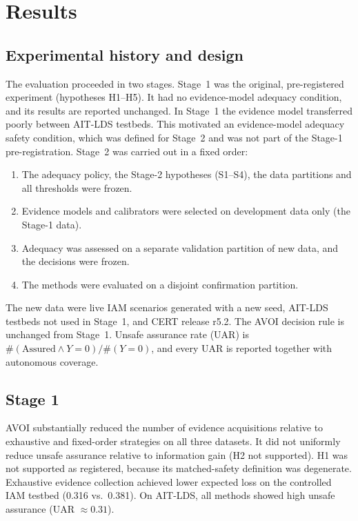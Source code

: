 \section{Results}

\subsection{Experimental history and design}
The evaluation proceeded in two stages. Stage~1 was the original, pre-registered experiment (hypotheses H1--H5). It had
no evidence-model adequacy condition, and its results are reported unchanged. In Stage~1 the evidence model transferred
poorly between AIT-LDS testbeds. This motivated an evidence-model adequacy safety condition, which was defined for
Stage~2 and was not part of the Stage-1 pre-registration. Stage~2 was carried out in a fixed order:
\begin{enumerate}
  \item The adequacy policy, the Stage-2 hypotheses (S1--S4), the data partitions and all thresholds were frozen.
  \item Evidence models and calibrators were selected on development data only (the Stage-1 data).
  \item Adequacy was assessed on a separate validation partition of new data, and the decisions were frozen.
  \item The methods were evaluated on a disjoint confirmation partition.
\end{enumerate}
The new data were live IAM scenarios generated with a new seed, AIT-LDS testbeds not used in Stage~1, and CERT release
r5.2. The AVOI decision rule is unchanged from Stage~1. Unsafe assurance rate (UAR) is
$\#(\text{Assured}\wedge Y{=}0)/\#(Y{=}0)$, and every UAR is reported together with autonomous coverage.

\subsection{Stage 1}
AVOI substantially reduced the number of evidence acquisitions relative to exhaustive and fixed-order strategies on all
three datasets. It did not uniformly reduce unsafe assurance relative to information gain (H2 not supported). H1 was not
supported as registered, because its matched-safety definition was degenerate. Exhaustive evidence collection achieved
lower expected loss on the controlled IAM testbed (0.316 vs.\ 0.381). On AIT-LDS, all methods showed high unsafe
assurance (UAR $\approx 0.31$).


